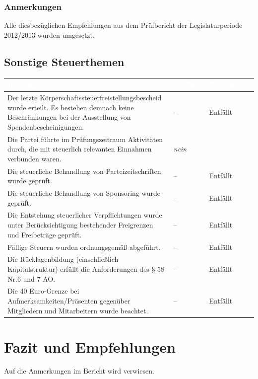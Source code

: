 \documentclass[%
	titlepage,oneside,12pt,headlines=1.5,numbers=noenddot, chapterprefix=false,parskip=full-,DIV=14,pagesize]{scrreprt}
\begin{document}
\subsection{Anmerkungen}
Alle diesbezüglichen Empfehlungen aus dem Prüfbericht der Legislaturperiode 2012/2013 wurden umgesetzt.

\pagebreak
\section{Sonstige Steuerthemen}
\begin{longtable}[ht]{|p{} p{} p{}|}
\hline\rowcolor{pirateorange} 
	\footnotesize\textcolor{white}{\textbf{Prüfung}} & \footnotesize\textcolor{white}{\textbf{Ja/Nein}} & \footnotesize\textcolor{white}{\textbf{Kommentar}}\\\endhead
        \scriptsize Der letzte Körperschaftssteuerfreistellungsbescheid wurde erteilt. Es bestehen demnach keine Beschränkungen bei der Ausstellung von Spendenbescheinigungen. & \scriptsize --  & \scriptsize Entfällt\\ 
        \scriptsize Die Partei führte im Prüfungszeitraum Aktivitäten durch, die mit steuerlich relevanten Einnahmen verbunden waren. & \scriptsize \textit{nein}	& \scriptsize \\
        \scriptsize Die steuerliche Behandlung von Parteizeitschriften wurde geprüft. & \scriptsize -- & \scriptsize Entfällt \\
       	\scriptsize Die steuerliche Behandlung von Sponsoring wurde geprüft. & \scriptsize -- & \scriptsize Entfällt \\
       	\scriptsize Die Entstehung steuerlicher Verpflichtungen wurde unter Berücksichtigung bestehender Freigrenzen und Freibeträge geprüft. & \scriptsize -- & \scriptsize Entfällt \\
       	\scriptsize Fällige Steuern wurden ordnungsgemäß abgeführt. & \scriptsize -- & \scriptsize Entfällt \\
        \scriptsize Die Rücklagenbildung (einschließlich Kapitalstruktur) erfüllt die Anforderungen des § 58 Nr.6 und 7 AO. & \scriptsize -- & \scriptsize Entfällt \\
        \scriptsize Die 40 Euro-Grenze bei Aufmerksamkeiten/Präsenten gegenüber Mitgliedern und Mitarbeitern wurde beachtet. & \scriptsize -- & \scriptsize Entfällt \\
\hline
\end{longtable}

\chapter{Fazit und Empfehlungen}
Auf die Anmerkungen im Bericht wird verwiesen. 
\end{document}
